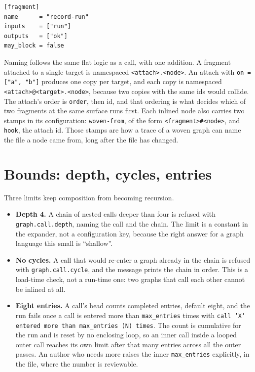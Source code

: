 \begin{lstlisting}
[fragment]
name      = "record-run"
inputs    = ["run"]
outputs   = ["ok"]
may_block = false
\end{lstlisting}

Naming follows the same flat logic as a call, with one addition. A fragment attached to a single
target is namespaced \texttt{<attach>.<node>}. An attach with \texttt{on = ["a", "b"]} produces one
copy per target, and each copy is namespaced \texttt{<attach>@<target>.<node>}, because two copies
with the same ids would collide. The attach's order is \texttt{order}, then id, and that ordering is
what decides which of two fragments at the same surface runs first. Each inlined node also carries
two stamps in its configuration: \texttt{woven-from}, of the form
\texttt{<fragment>\#<node>}, and \texttt{hook}, the attach id. Those stamps are how a trace of a
woven graph can name the file a node came from, long after the file has changed.

\section{Bounds: depth, cycles, entries}

Three limits keep composition from becoming recursion.

\begin{itemize}
	\item \textbf{Depth 4.} A chain of nested calls deeper than four is refused with
	\texttt{graph.call.depth}, naming the call and the chain. The limit is a constant in the
	expander, not a configuration key, because the right answer for a graph language this small is
	\enquote{shallow}.
	\item \textbf{No cycles.} A call that would re-enter a graph already in the chain is refused with
	\texttt{graph.call.cycle}, and the message prints the chain in order. This is a load-time check,
	not a run-time one: two graphs that call each other cannot be inlined at all.
	\item \textbf{Eight entries.} A call's head counts completed entries, default eight, and the run
	fails once a call is entered more than \texttt{max\_entries} times with \texttt{call 'X' entered
	more than max\_entries (N) times}. The count is cumulative for the run and is reset by no
	enclosing loop, so an inner call inside a looped outer call reaches its own limit after that many
	entries across all the outer passes. An author who needs more raises the inner
\texttt{max\_entries} explicitly, in the file, where the number is reviewable.
\end{itemize}

